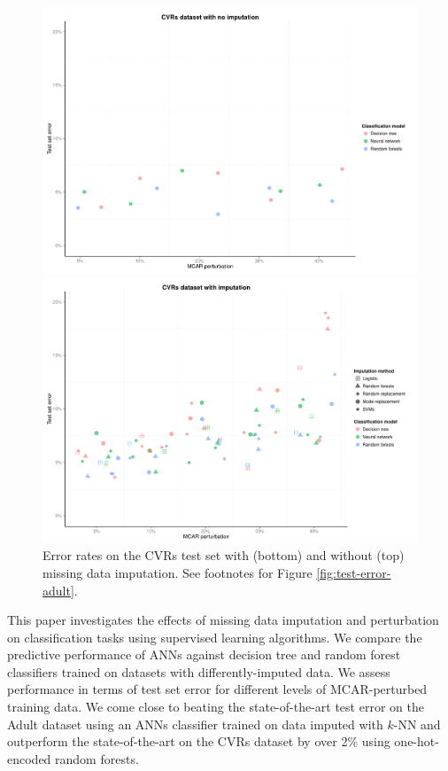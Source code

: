 \documentclass[10pt]{book}
\theoremstyle{definition}
\begin{document}
\begin{figure}[h!]
\includegraphics[scale=0.6, center]{figure/test-errors-votes-no-imp-mcar}\par
\includegraphics[scale=0.6, center]{figure/test-errors-votes-imp-mcar}\par
   \caption{\footnotesize Error rates on the CVRs test set with (bottom) and without (top) missing data imputation. See footnotes for Figure \ref{fig:test-error-adult}.}
   \label{fig:test-error-votes}
\end{figure}

\par

\setcounter{chapter}{4}
\setcounter{equation}{0} %

This paper investigates the effects of missing data imputation and perturbation on classification tasks using supervised learning algorithms. We compare the predictive performance of ANNs against decision tree and random forest classifiers trained on datasets with differently-imputed data. We assess performance in terms of test set error for different levels of MCAR-perturbed training data. We come close to beating the state-of-the-art test error on the Adult dataset using an ANNs classifier trained on data imputed with $k$-NN and outperform the state-of-the-art on the CVRs dataset by over 2\% using one-hot-encoded random forests. 
\end{document}
